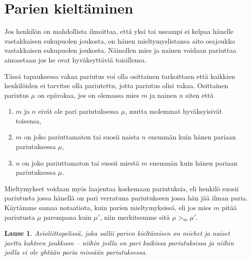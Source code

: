 \documentclass[finnish]{tktltiki2}
\newtheorem{lau}{Lause}
\theoremstyle{definition}
\theoremstyle{remark}
\begin{document}
\section{Parien kieltäminen}
Jos henkilön on mahdollista ilmoittaa, että yksi tai useampi ei kelpaa hänelle vastakkaisen sukupuolen joukosta, on hänen mieltymyslistansa aito osajoukko vastakkaisen sukupuolen joukosta. Näinollen mies ja nainen voidaan pariuttaa ainoastaan jos he ovat hyväksyttäviä toisillensa.

Tässä tapauksessa vakaa pariutus voi olla osittainen tarkoittaen että kaikkien henkilöiden ei tarvitse olla pariutettu, jotta pariutus olisi vakaa. Osittainen pariutus $\mu$ on epävakaa, jos on olemassa mies $m$ ja nainen $n$ siten että
\begin{enumerate}
	\item $m$ ja $n$ eivät ole pari pariutuksessa $\mu$, mutta molemmat hyväksyisivät toisensa,
	\item $m$ on joko pariuttamaton tai suosii naista $n$ enemmän kuin hänen pariaan pariutuksessa $\mu$,
	\item $n$ on joko pariuttamaton tai suosii miestä $m$ enemmän kuin hänen pariaan pariutuksessa $\mu$.
\end{enumerate} 
Mieltymykset voidaan myös laajentaa koskemaan pariutuksia, eli henkilö suosii pariutusta jossa hänellä on pari verratuna pariutukseen jossa hän jää ilman paria. Käytämme samaa notaatiota, kuin parien mieltymyksissä, eli jos mies $m$ pitää pariutusta $\mu$ parempana kuin $\mu'$, niin merkitsemme sitä $\mu >_m \mu'$.

\begin{lau}
Avioliittopelissä, joka sallii parien kieltämisen on miehet ja naiset jaettu kahteen joukkoon -- niihin joilla on pari kaikissa pariutuksissa ja niihin joilla ei ole yhtään paria missään pariutuksessa.
\end{lau}
\end{document}
